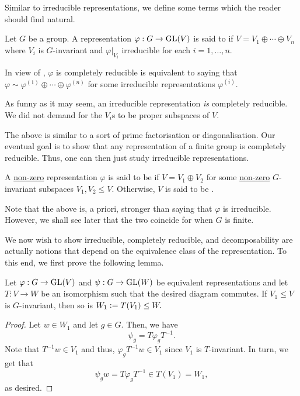 Similar to irreducible representations, we define some terms which the reader should find natural.

\begin{defn}%
	Let $G$ be a group. A representation $\varphi:G\to \operatorname{GL}(V)$ is said to  if $V = V_1 \oplus \cdots \oplus V_n$ where $V_i$ is $G$-invariant and $\varphi|_{V_i}$ irreducible for each $i = 1, \ldots, n.$
\end{defn}

\begin{rem}
	In view of , $\varphi$ is completely reducible is equivalent to saying that $\varphi\sim\varphi^{(1)}\oplus\cdots\oplus\varphi^{(n)}$ for some irreducible representations $\varphi^{(i)}.$
\end{rem}

\begin{rem}
	As funny as it may seem, an irreducible representation \emph{is} completely reducible. We did not demand for the $V_i$s to be proper subspaces of $V.$
\end{rem}

The above is similar to a sort of prime factorisation or diagonalisation. Our eventual goal is to show that any representation of a finite group is completely reducible. Thus, one can then just study irreducible representations.

\begin{defn}%
	A \underline{non-zero} representation $\varphi$ is said to be  if $V = V_1 \oplus V_2$ for some \underline{non-zero} $G$-invariant subspaces $V_1, V_2 \le V.$ Otherwise, $V$ is said to be .
\end{defn}

Note that the above is, a priori, stronger than saying that $\varphi$ is irreducible. However, we shall see later that the two coincide for when $G$ is finite.

We now wish to show irreducible, completely reducible, and decomposability are actually notions that depend on the equivalence class of the representation. To this end, we first prove the following lemma.

\begin{lem} \label{lem:isopreservesinv}
	Let $\varphi:G \to \operatorname{GL}(V)$ and $\psi:G \to \operatorname{GL}(W)$ be equivalent representations and let $T: V \to W$ be an isomorphism such that the desired diagram commutes. If $V_1 \le V$ is $G$-invariant, then so is $W_1 \vcentcolon= T(V_1) \le W.$
\end{lem}
\begin{proof} 
	Let $w \in W_1$ and let $g \in G.$ Then, we have
	\begin{equation*} 
		\psi_g = T\varphi_gT^{-1}.
	\end{equation*}
	Note that $T^{-1}w \in V_1$ and thus, $\varphi_gT^{-1}w \in V_1$ since $V_1$ is $T$-invariant. In turn, we get that
	\begin{equation*} 
		\psi_gw = T\varphi_gT^{-1} \in T(V_1) = W_1,
	\end{equation*}
	as desired.
\end{proof}

